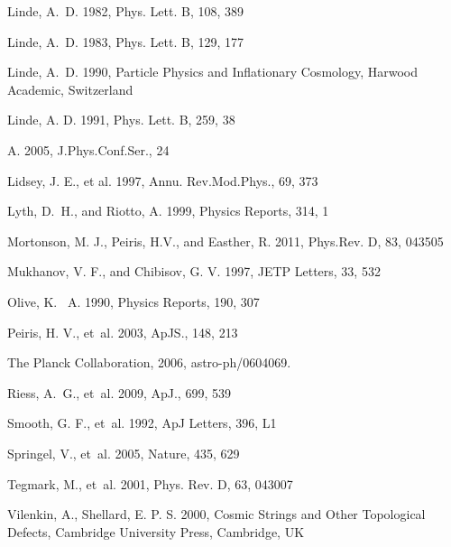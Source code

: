 \documentclass{rmaa}
\begin{document}
\begin{thebibliography}
Linde, A.~D. 1982, Phys. Lett. B, 108,  389 
 
 Linde, A.~D. 1983, Phys. Lett. B, 129, 177 

 Linde, A.~D. 1990, Particle Physics and Inflationary Cosmology, Harwood Academic,
Switzerland 

 Linde, A. D. 1991, Phys. Lett. B,  259, 38
 
 A. 2005, J.Phys.Conf.Ser., 24 
 
  Lidsey, J. E., et al. 1997, Annu. Rev.Mod.Phys., 69,  373  
 
Lyth, D.~H., and {Riotto,} A. 1999, Physics Reports, 314, 1

Mortonson, M. J., Peiris, H.V., and Easther, R. 2011, Phys.Rev. D, 83, 043505 
  
 Mukhanov, V. F., and {Chibisov,} G. V. 1997, JETP Letters, 33, 532
  
 Olive, K. ~A. 1990, Physics Reports, 190, 307  

Peiris, H. V., et~al. 2003, ApJS., 148, 213  
 
   The Planck Collaboration, 2006, astro-ph/0604069. 
 
 Riess, A.~G., et~al. 2009, ApJ., 699, 539 

Smooth, G. F., et~al. 1992, ApJ Letters, 396, L1 
  
 Springel, V., et~al.  2005, Nature, 435, 629  

Tegmark, M., et~al. 2001, Phys. Rev. D, 63, 043007   

 Vilenkin, A., Shellard, E. P. S. 2000, Cosmic Strings and Other Topological Defects,
Cambridge University Press,  Cambridge, UK 




\end{thebibliography}
\end{document}
